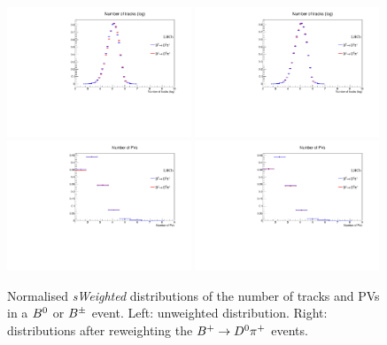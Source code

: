 \begin{figure}[t]
  \begin{center}
   \includegraphics[width=0.49\textwidth]{AA-Appdx-OSTaggers/figs/nTracks_BuVSBd_Unweighted.pdf}
   \includegraphics[width=0.49\textwidth]{AA-Appdx-OSTaggers/figs/nTracks_BuVSBd_Weighted.pdf} \\
   \includegraphics[width=0.49\textwidth]{AA-Appdx-OSTaggers/figs/nPV_BuVSBd_Unweighted.pdf}
   \includegraphics[width=0.49\textwidth]{AA-Appdx-OSTaggers/figs/nPV_BuVSBd_Weighted.pdf}\\
  \end{center}
  \vspace{-2mm}
  \caption{Normalised \emph{sWeighted} distributions of the number of tracks and PVs in a $B^0$ or $B^\pm$ event. Left: unweighted distribution. Right: distributions after reweighting the $B^+\rightarrow D^0\pi^+$ events.}
  \label{fig:reweightingOSgb2}
\end{figure}

